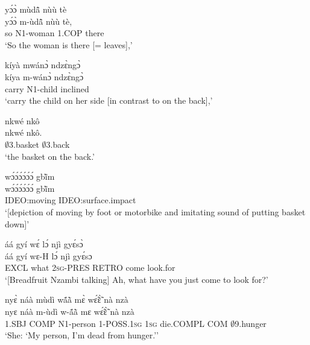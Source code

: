 \begin{exe} 
\exN\label{34} 
  \glll  yɔ́ɔ̀ mùdã̂ nùù tè \\
         yɔ́ɔ̀ m-ùdã̂ nùù tè, \\
          so N1-woman 1.COP there \\
    \trans `So the woman is there [= leaves],'
\end{exe}

\begin{exe} 
\exN\label{35}
  \glll  kíyà mwánɔ̀ ndzɛ̀ngɔ̀  \\
        kíya m-wánɔ̀ ndzɛ̀ngɔ̀ \\
          carry N1-child inclined    \\
    \trans `carry the child on her side [in contrast to on the back],'
\end{exe}

\begin{exe} 
\exN\label{36}
  \glll nkwé nkô \\
         nkwé nkô. \\
          $\emptyset$3.basket $\emptyset$3.back \\
    \trans `the basket on the back.'
\end{exe}

\begin{exe} 
\exN\label{37}
  \glll  wɔ́ɔ́ɔ́ɔ́ɔ́ɔ́ gbĩ̀m  \\
           wɔ́ɔ́ɔ́ɔ́ɔ́ɔ́ gbĩ̀m  \\
            IDEO:moving IDEO:surface.impact  \\
    \trans `[depiction of moving by foot or motorbike and imitating sound of putting basket down]'
\end{exe}

\begin{exe} 
\exN\label{38}
  \glll  áá gyí wɛ́ lɔ́ njì gyɛ́sɔ̀ \\
        áá gyí wɛ-H lɔ́ njì gyɛ́sɔ \\
           EXCL what 2\textsc{sg}-PRES RETRO come look.for  \\
    \trans `[Breadfruit Nzambi talking] Ah, what have you just come to look for?'
\end{exe}

\begin{exe} 
\exN\label{39} 
  \glll  nyɛ̀ náà mùdì wã́ã̀ mɛ̀ wɛ̃́ɛ̃̀ nà nzà \\
         nyɛ náà m-ùdì w-ã́ã̀ mɛ wɛ̃́ɛ̃̀ nà nzà \\
           1.SBJ COMP N1-person 1-POSS.1\textsc{sg} 1\textsc{sg} die.COMPL COM $\emptyset$9.hunger\\
    \trans `She: `My person, I'm dead from hunger.''
\end{exe}

